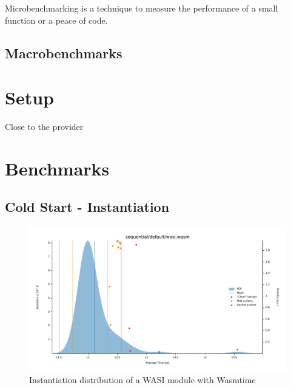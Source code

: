 Microbenchmarking is a technique to measure the performance of a small function or a peace of code.  

\subsection{Macrobenchmarks}
\label{subsec:macrobenchmarks}


\section{Setup}
\label{sec:setup}

Close to the provider


\section{Benchmarks}
\label{sec:benchmarks}

\subsection{Cold Start - Instantiation}
\label{subsec:cold-start}

\begin{figure}[htbp]
    \centering
        \includegraphics[width=1\linewidth]{images/benches/sequential_default_wasi.pdf}
    \caption{Instantiation distribution of a WASI module with Wasmtime}
    \label{fig:bench:instantiation:wasi}
\end{figure}

